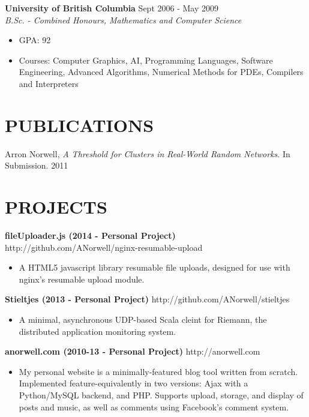 \documentclass[line,margin]{res}
\begin{document}
\begin{resume}
    {\bf University of British Columbia} \hfill Sept 2006 - May 2009 \\
    {\sl B.Sc. - Combined Honours, Mathematics and Computer Science}
                 \begin{itemize}  \itemsep -2pt %
                 \item GPA: 92\item Courses: Computer Graphics, AI, Programming Languages, Software Engineering, Advanced Algorithms, Numerical Methods for PDEs, Compilers and Interpreters 
                \end{itemize}
  

\section{PUBLICATIONS}

    Arron Norwell, {\sl A Threshold for Clusters in Real-World Random Networks}. In Submission.  \hfill 2011 \\
  

\section{PROJECTS}

{\bf fileUploader.js (2014 - Personal Project)} \hfill http://github.com/ANorwell/nginx-resumable-upload
                 \begin{itemize}  \itemsep -2pt %
                 \item A HTML5 javascript library resumable file uploads, designed for use with nginx's resumable upload module. 
                \end{itemize}
  
{\bf Stieltjes (2013 - Personal Project)} \hfill http://github.com/ANorwell/stieltjes
                 \begin{itemize}  \itemsep -2pt %
                 \item A minimal, asynchronous UDP-based Scala cleint for Riemann, the distributed application monitoring system. 
                \end{itemize}
  
{\bf anorwell.com (2010-13 - Personal Project)} \hfill http://anorwell.com
                 \begin{itemize}  \itemsep -2pt %
                 \item My personal website is a minimally-featured blog tool written from scratch. Implemented feature-equivalently in two versions: Ajax with a Python/MySQL backend, and PHP.  Supports upload, storage, and display of posts and music, as well as comments using Facebook's comment system. 
                \end{itemize}
  

\end{resume}
\end{document}
